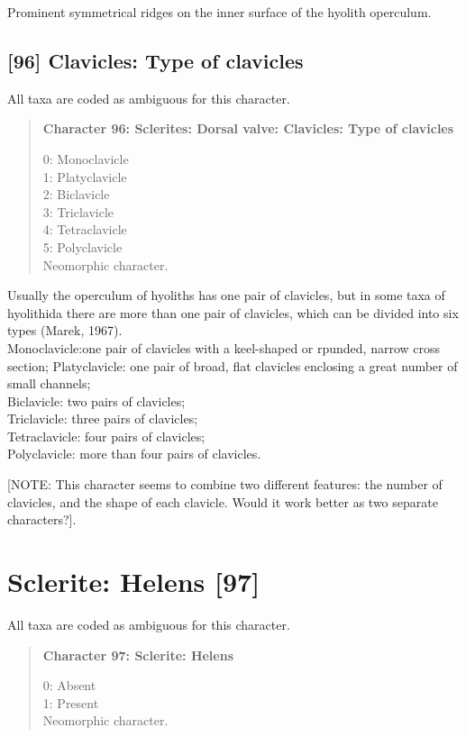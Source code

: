 \documentclass[openany]{book}
\theoremstyle{definition}
\theoremstyle{definition}
\theoremstyle{definition}
\theoremstyle{remark}
\begin{document}
Prominent symmetrical ridges on the inner surface of the hyolith
operculum.

\subsection*{{[}96{]} Clavicles: Type of
clavicles}\label{clavicles-type-of-clavicles}

All taxa are coded as ambiguous for this character.

\begin{quote}
\textbf{Character 96: Sclerites: Dorsal valve: Clavicles: Type of
clavicles}

0: Monoclavicle\\
1: Platyclavicle\\
2: Biclavicle\\
3: Triclavicle\\
4: Tetraclavicle\\
5: Polyclavicle\\
Neomorphic character.
\end{quote}

Usually the operculum of hyoliths has one pair of clavicles, but in some
taxa of hyolithida there are more than one pair of clavicles, which can
be divided into six types (Marek, 1967).\\
Monoclavicle:one pair of clavicles with a keel-shaped or rpunded, narrow
cross section; Platyclavicle: one pair of broad, flat clavicles
enclosing a great number of small channels;\\
Biclavicle: two pairs of clavicles;\\
Triclavicle: three pairs of clavicles;\\
Tetraclavicle: four pairs of clavicles;\\
Polyclavicle: more than four pairs of clavicles.

{[}NOTE: This character seems to combine two different features: the
number of clavicles, and the shape of each clavicle. Would it work
better as two separate characters?{]}.

\section{Sclerite: Helens {[}97{]}}\label{sclerite-helens-97}

All taxa are coded as ambiguous for this character.

\begin{quote}
\textbf{Character 97: Sclerite: Helens}

0: Absent\\
1: Present\\
Neomorphic character.
\end{quote}
\end{document}
